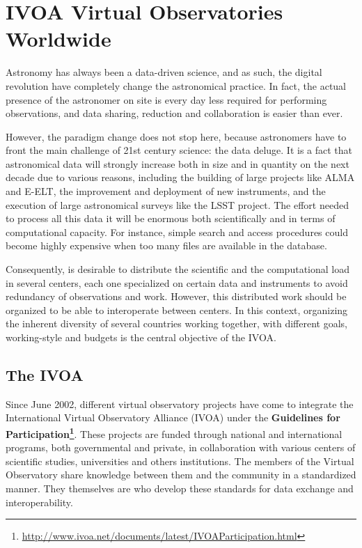 \section{IVOA Virtual Observatories Worldwide}

Astronomy has always been a data-driven science, and as such, 
the digital revolution have completely change the astronomical practice.
In fact, the actual presence of the astronomer on site is every
day less required for performing observations, and data sharing, reduction
and collaboration is easier than ever. 

However, the paradigm change 
does not stop here, because astronomers have to front the main challenge of
21st century science: the data deluge. It is a fact that astronomical data will
strongly increase both in size and in quantity on the next decade due to various
reasons, including the building of large projects like ALMA and E-ELT, 
the improvement and deployment of new instruments, and the execution of 
large astronomical surveys like the LSST project.
The effort needed to process all this data it will be enormous both
scientifically and in terms of computational capacity. 
For instance, simple search and access procedures could become highly expensive
when too many files are available in the database.

Consequently, is desirable to distribute the scientific and the computational 
load in several centers, each one specialized on certain data and instruments
to avoid redundancy of observations and work. However, this distributed work
should be organized to be able to interoperate between centers.
In this context, organizing the inherent diversity of several countries working together, 
with different goals, working-style and budgets is the central objective of
the IVOA.

\subsection{The IVOA}

Since June 2002, different virtual observatory projects have come to integrate the
International Virtual Observatory Alliance (IVOA) under the \textbf{Guidelines
for Participation\footnote{\url{http://www.ivoa.net/documents/latest/IVOAParticipation.html}}}. 
These projects are funded through national and international programs, both governmental and 
private, in collaboration with various centers of scientific studies, universities and
others institutions. The members of the Virtual Observatory share
knowledge between them and the community in a standardized manner. They
themselves are who develop these standards for data exchange and
interoperability. 

